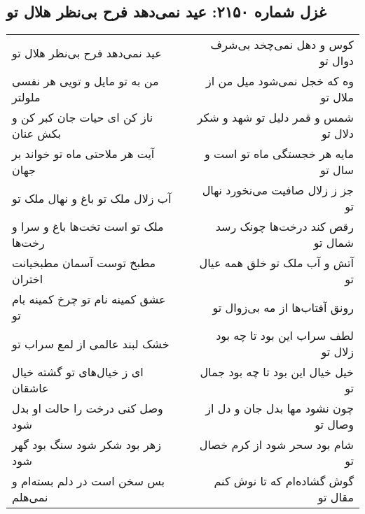 \begin{center}
\section*{غزل شماره ۲۱۵۰: عید نمی‌دهد فرح بی‌نظر هلال تو}
\label{sec:2150}
\begin{longtable}{l p{0.5cm} r}
عید نمی‌دهد فرح بی‌نظر هلال تو
&&
کوس و دهل نمی‌چخد بی‌شرف دوال تو
\\
من به تو مایل و تویی هر نفسی ملولتر
&&
وه که خجل نمی‌شود میل من از ملال تو
\\
ناز کن ای حیات جان کبر کن و بکش عنان
&&
شمس و قمر دلیل تو شهد و شکر دلال تو
\\
آیت هر ملاحتی ماه تو خواند بر جهان
&&
مایه هر خجستگی ماه تو است و سال تو
\\
آب زلال ملک تو باغ و نهال ملک تو
&&
جز ز زلال صافیت می‌نخورد نهال تو
\\
ملک تو است تخت‌ها باغ و سرا و رخت‌ها
&&
رقص کند درخت‌ها چونک رسد شمال تو
\\
مطبخ توست آسمان مطبخیانت اختران
&&
آتش و آب ملک تو خلق همه عیال تو
\\
عشق کمینه نام تو چرخ کمینه بام تو
&&
رونق آفتاب‌ها از مه بی‌زوال تو
\\
خشک لبند عالمی از لمع سراب تو
&&
لطف سراب این بود تا چه بود زلال تو
\\
ای ز خیال‌های تو گشته خیال عاشقان
&&
خیل خیال این بود تا چه بود جمال تو
\\
وصل کنی درخت را حالت او بدل شود
&&
چون نشود مها بدل جان و دل از وصال تو
\\
زهر بود شکر شود سنگ بود گهر شود
&&
شام بود سحر شود از کرم خصال تو
\\
بس سخن است در دلم بسته‌ام و نمی‌هلم
&&
گوش گشاده‌ام که تا نوش کنم مقال تو
\\
\end{longtable}
\end{center}
